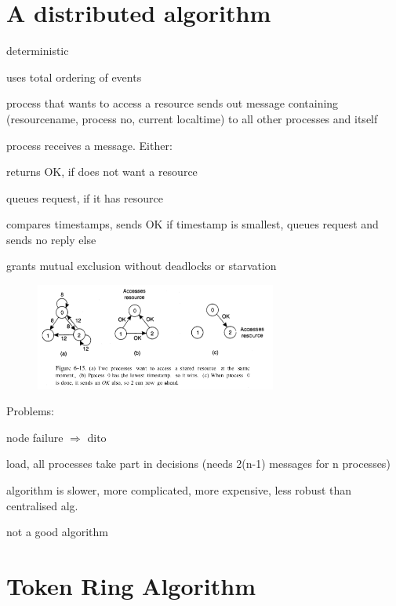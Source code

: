 \documentclass[ngerman,a4paper]{report}
\begin{document}
\section{A distributed algorithm}
\begin{compactitem}
	\item deterministic
	\item uses total ordering of events
	\item process that wants to access a resource sends out message containing (resourcename, process no, current localtime) to all other processes and itself
	\item process receives a message. Either:\\
		\begin{compactenum}
			\item returns OK, if does not want a resource
			\item queues request, if it has resource
			\item compares timestamps, sends OK if timestamp is smallest, queues request and sends no reply else
		\end{compactenum}
	\item grants mutual exclusion without deadlocks or starvation
\end{compactitem}

\begin{figure}[h]
	\centering
	\includegraphics[width=300px]{gfx/mutex-distributed.png}
	\label{img:mutex-distributed}
\end{figure}


Problems:
\begin{compactitem}
	\item node failure $\Rightarrow$ dito
    \item load, all processes take part in decisions (needs 2(n-1) messages for n processes)
	\item algorithm is slower, more complicated, more expensive, less robust than centralised alg.
	\item not a good algorithm
\end{compactitem}

\section{Token Ring Algorithm}
\end{document}
